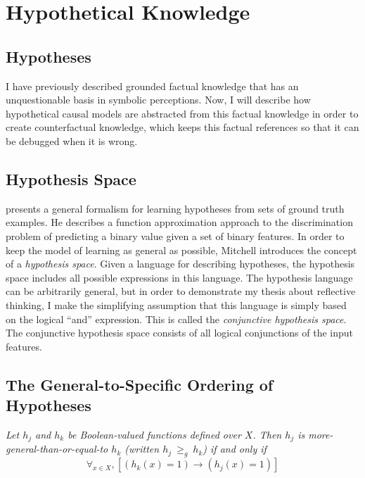 \chapter{Hypothetical Knowledge}
\label{chapter:hypothetical_knowledge}

\section{Hypotheses}

I have previously described grounded factual knowledge that has an
unquestionable basis in symbolic perceptions.  Now, I will describe
how hypothetical causal models are abstracted from this factual
knowledge in order to create counterfactual knowledge, which keeps
this factual references so that it can be debugged when it is wrong.

\section{Hypothesis Space}

\cite{mitchell:1997} presents a general formalism for learning
hypotheses from sets of ground truth examples.  He describes a
function approximation approach to the discrimination problem of
predicting a binary value given a set of binary features.  In order to
keep the model of learning as general as possible, Mitchell introduces
the concept of a \emph{hypothesis space}.  Given a language for
describing hypotheses, the hypothesis space includes all possible
expressions in this language.  The hypothesis language can be
arbitrarily general, but in order to demonstrate my thesis about
reflective thinking, I make the simplifying assumption that this
language is simply based on the logical ``and'' expression.  This is
called the \emph{conjunctive hypothesis space}.  The conjunctive
hypothesis space consists of all logical conjunctions of the input
features.

\section{The General-to-Specific Ordering of Hypotheses}

\begin{definition}
\emph{Let $h_j$ and $h_k$ be Boolean-valued functions defined over
  $X$. Then $h_j$ is more-general-than-or-equal-to $h_k$ (written
  $h_j\ \geq_g\ h_k$) if and only if
\begin{equation*}
\forall_{x \in X}, [(h_k(x) = 1) \rightarrow (h_j(x) = 1)]
\end{equation*}
}\end{definition}


